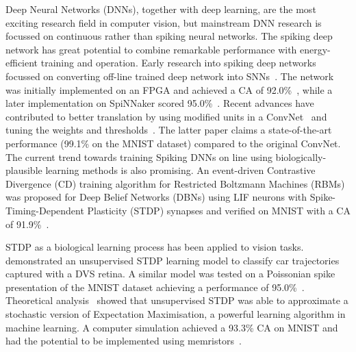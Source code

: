 Deep Neural Networks (DNNs), together with deep learning, are the most exciting research field in computer vision, but mainstream DNN research is focussed on continuous rather than spiking neural networks.
The spiking deep network has great potential to combine remarkable performance with energy-efficient training and operation.
Early research into spiking deep networks focussed on converting off-line trained deep network into SNNs~\cite{o2013real}.
The network was initially implemented on an FPGA and achieved a CA of 92.0\%~\cite{neil2014minitaur}, while a later implementation on SpiNNaker scored 95.0\%~\cite{Stromatias2015scalable}.
Recent advances have contributed to better translation by using modified units in a ConvNet~\cite{cao2015spiking} and tuning the weights and thresholds~\cite{Diehl2015fast}.
The latter paper claims a state-of-the-art performance (99.1\% on the MNIST dataset) compared to the original ConvNet.
The current trend towards training Spiking DNNs on line using biologically-plausible learning methods is also promising.
An event-driven Contrastive Divergence (CD) training algorithm for Restricted Boltzmann Machines (RBMs) was proposed for Deep Belief Networks (DBNs) using LIF neurons with Spike-Timing-Dependent Plasticity (STDP) synapses and verified on MNIST with a CA of 91.9\%~\cite{neftci2013event}.

STDP as a biological learning process has been applied to vision tasks.
\cite{bichler2012extraction} demonstrated an unsupervised STDP learning model to classify car trajectories captured with a DVS retina. 
A similar model was tested on a Poissonian spike presentation of the MNIST dataset achieving a performance of 95.0\%~\cite{diehl2015unsupervised}.
Theoretical analysis~\cite{nessler2013bayesian} showed that unsupervised STDP was able to approximate a stochastic version of Expectation Maximisation, a powerful learning algorithm in machine learning.
A computer simulation achieved a 93.3\% CA on MNIST and had the potential to be implemented using memristors~\cite{bill2014compound}. 


